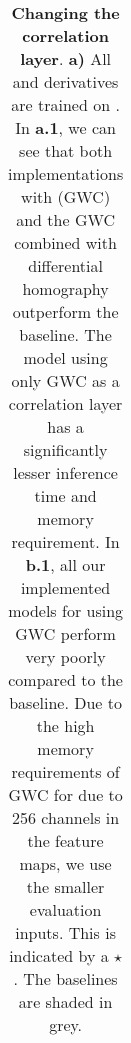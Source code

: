 \begin{table}[ht!]
\begin{adjustbox}{width=1\textwidth}
\begin{tabular}{|l
|c c
|c c
|c c
|c c
|c c
||c |c |c |c |c
|}
	
\hline




	

\end{tabular}
\end{adjustbox}
\caption[Changing the correlation layer]{\textbf{Changing the correlation layer}.
\textbf{a)} All {\mvsn} and {\rmvd} derivatives are trained on {\bms}. In \textbf{a.1}, we can see that both implementations with {\gwc} (GWC) and the GWC combined with differential homography outperform the baseline. The model using only GWC as a correlation layer has a significantly lesser inference time and memory requirement. In \textbf{b.1}, all our implemented models for {\rmvd} using GWC perform very poorly compared to the baseline. Due to the high memory requirements of GWC for {\rmvd} due to 256 channels in the feature maps, we use the smaller evaluation inputs. This is indicated by a \(\star\). The baselines are shaded in grey.
\label{tab:corr-layer}
}
\end{table}

